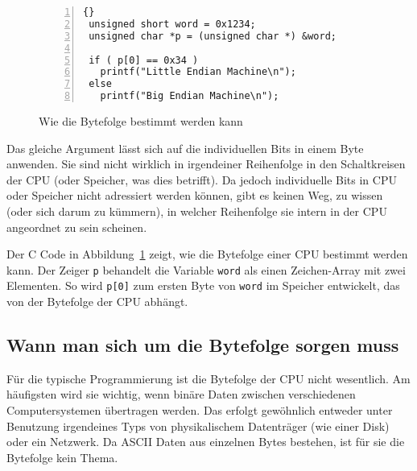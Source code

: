 \begin{figure}[ht]
\begin{lstlisting}[numbers=left, stepnumber=1, frame=tblr]{}
 unsigned short word = 0x1234;
 unsigned char *p = (unsigned char *) &word;

 if ( p[0] == 0x34 )
   printf("Little Endian Machine\n");
 else
   printf("Big Endian Machine\n");

\end{lstlisting}
\caption{Wie die Bytefolge bestimmt werden kann
\label{fig:determineEndian}}
\end{figure}
%

Das gleiche Argument l\"{a}sst sich auf die individuellen Bits in einem
Byte anwenden. Sie sind nicht wirklich in irgendeiner Reihenfolge in
den Schaltkreisen der CPU (oder Speicher, was dies betrifft). Da
jedoch individuelle Bits in CPU oder Speicher nicht adressiert
werden k\"{o}nnen, gibt es keinen Weg, zu wissen (oder sich darum zu
k\"{u}mmern), in welcher Reihenfolge sie intern in der CPU angeordnet zu
sein scheinen.

Der C Code in Abbildung~\ref{fig:determineEndian} zeigt, wie die
Bytefolge einer CPU bestimmt werden kann. Der Zeiger \lstinline|p|
behandelt die Variable \lstinline|word| als einen Zeichen-Array mit
zwei Elementen. So wird \lstinline|p[0]| zum ersten Byte von
\lstinline|word| im Speicher entwickelt, das von der Bytefolge der
CPU abh\"{a}ngt.

\subsection{Wann man sich um die Bytefolge sorgen muss}

F\"{u}r die typische Programmierung ist die Bytefolge der CPU nicht
wesentlich. Am h\"{a}ufigsten wird sie wichtig, wenn bin\"{a}re Daten
zwischen verschiedenen Computersystemen \"{u}bertragen werden. Das
erfolgt gew\"{o}hnlich entweder unter Benutzung irgendeines Typs von
physikalischem Datentr\"{a}ger (wie einer Disk) oder ein Netzwerk.
 Da ASCII 
Daten aus einzelnen Bytes bestehen, ist f\"{u}r sie die Bytefolge kein
Thema.

